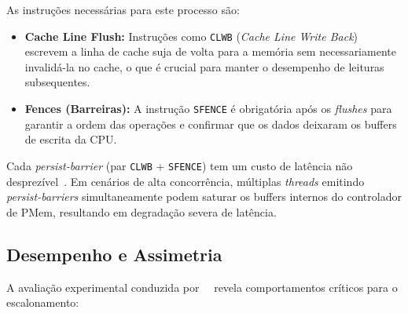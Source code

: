 As instruções necessárias para este processo são:

\begin{itemize}
    \item \textbf{Cache Line Flush:} Instruções como \texttt{CLWB}
    (\textit{Cache Line Write Back}) escrevem a linha de cache suja de volta para
    a memória sem necessariamente invalidá-la no cache, o que é crucial para
    manter o desempenho de leituras subsequentes.

    \item \textbf{Fences (Barreiras):} A instrução \texttt{SFENCE} é obrigatória
    após os \textit{flushes} para garantir a ordem das operações e confirmar que
    os dados deixaram os buffers de escrita da CPU.
\end{itemize}

Cada \textit{persist-barrier} (par \texttt{CLWB} + \texttt{SFENCE}) tem um custo
de latência não desprezível~\cite{van_renen_2020}. Em cenários de alta
concorrência, múltiplas \textit{threads} emitindo \textit{persist-barriers}
simultaneamente podem saturar os buffers internos do controlador de PMem,
resultando em degradação severa de latência.

\subsection*{Desempenho e Assimetria}

A avaliação experimental conduzida por~\citeauthor{van_renen_2020}~\cite{van_renen_2020}
revela comportamentos críticos para o escalonamento:

